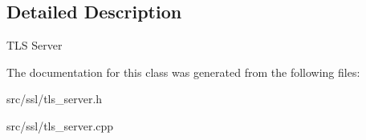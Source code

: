 \subsection{Detailed Description}
T\-L\-S Server 

The documentation for this class was generated from the following files\-:\begin{DoxyCompactItemize}
\item 
src/ssl/tls\-\_\-server.\-h\item 
src/ssl/tls\-\_\-server.\-cpp\end{DoxyCompactItemize}
